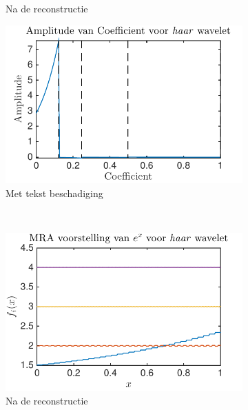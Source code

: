 \begin{figure}
\begin{subfigure}[b]{0.45\textwidth}
        \caption{Na de reconstructie}
        \label{fig:mouse}
    \end{subfigure}
    \begin{subfigure}[b]{0.45\textwidth}
        \includegraphics[width=\textwidth]{../src/denoising/haar_noNoise/coef_exp_haar_3}
        \caption{Met tekst beschadiging}
        \label{fig:tiger}
    \end{subfigure}
    ~ %
    \begin{subfigure}[b]{0.45\textwidth}
        \includegraphics[width=\textwidth]{../src/denoising/haar_noNoise/MRA_exp_haar_3}
        \caption{Na de reconstructie}
        \label{fig:mouse}
    \end{subfigure}
    \begin{subfigure}[b]{0.45\textwidth}

\end{subfigure}
\end{figure}
